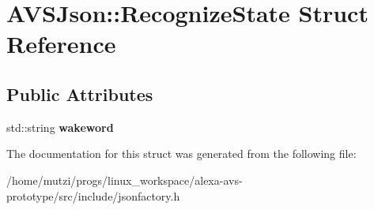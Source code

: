\hypertarget{structAVSJson_1_1RecognizeState}{}\section{A\+V\+S\+Json\+:\+:Recognize\+State Struct Reference}
\label{structAVSJson_1_1RecognizeState}
\subsection*{Public Attributes}
\begin{DoxyCompactItemize}
\item 
\mbox{\label{structAVSJson_1_1RecognizeState_ad9a2cf658755a87fb9cf64e697a34a0d}} 
std\+::string {\bfseries wakeword}
\end{DoxyCompactItemize}


The documentation for this struct was generated from the following file\+:\begin{DoxyCompactItemize}
\item 
/home/mutzi/progs/linux\+\_\+workspace/alexa-\/avs-\/prototype/src/include/jsonfactory.\+h\end{DoxyCompactItemize}
